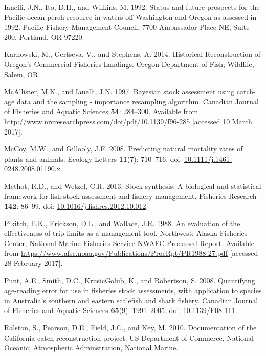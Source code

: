 \documentclass[12pt,]{article}
\begin{document}
\hypertarget{ref-ianelli_status_1992}{}
Ianelli, J.N., Ito, D.H., and Wilkins, M. 1992. Status and future
prospects for the Pacific ocean perch resource in waters off Washington
and Oregon as assessed in 1992. Pacific Fishery Management Council, 7700
Ambassador Place NE, Suite 200, Portland, OR 97220.

\hypertarget{ref-karnowski_historical_2014}{}
Karnowski, M., Gertseva, V., and Stephens, A. 2014. Historical
Reconstruction of Oregon's Commercial Fisheries Landings. Oregon
Department of Fish; Wildlife, Salem, OR.

\hypertarget{ref-mcallister_bayesian_1997}{}
McAllister, M.K., and Ianelli, J.N. 1997. Bayesian stock assessment
using catch-age data and the sampling - importance resampling algorithm.
Canadian Journal of Fisheries and Aquatic Sciences \textbf{54}:
284--300. Available from
\url{http://www.nrcresearchpress.com/doi/pdf/10.1139/f96-285}
{[}accessed 10 March 2017{]}.

\hypertarget{ref-mccoy_predicting_2008}{}
McCoy, M.W., and Gillooly, J.F. 2008. Predicting natural mortality rates
of plants and animals. Ecology Letters \textbf{11}(7): 710--716. doi:
\href{https://doi.org/10.1111/j.1461-0248.2008.01190.x}{10.1111/j.1461-0248.2008.01190.x}.

\hypertarget{ref-methot_stock_2013}{}
Methot, R.D., and Wetzel, C.R. 2013. Stock synthesis: A biological and
statistical framework for fish stock assessment and fishery management.
Fisheries Research \textbf{142}: 86--99. doi:
\href{https://doi.org/10.1016/j.fishres.2012.10.012}{10.1016/j.fishres.2012.10.012}.

\hypertarget{ref-pikitch_evaluation_1988}{}
Pikitch, E.K., Erickson, D.L., and Wallace, J.R. 1988. An evaluation of
the effectiveness of trip limits as a management tool. Northwest; Alaska
Fisheries Center, National Marine Fisheries Service NWAFC Processed
Report. Available from
\url{https://www.afsc.noaa.gov/Publications/ProcRpt/PR1988-27.pdf}
{[}accessed 28 February 2017{]}.

\hypertarget{ref-punt_quantifying_2008}{}
Punt, A.E., Smith, D.C., KrusicGolub, K., and Robertson, S. 2008.
Quantifying age-reading error for use in fisheries stock assessments,
with application to species in Australia's southern and eastern
scalefish and shark fishery. Canadian Journal of Fisheries and Aquatic
Sciences \textbf{65}(9): 1991--2005. doi:
\href{https://doi.org/10.1139/F08-111}{10.1139/F08-111}.

\hypertarget{ref-ralston_documentation_2010}{}
Ralston, S., Pearson, D.E., Field, J.C., and Key, M. 2010. Documentation
of the California catch reconstruction project. US Department of
Commerce, National Oceanic; Atmospheric Adminstration, National Marine.
\end{document}
